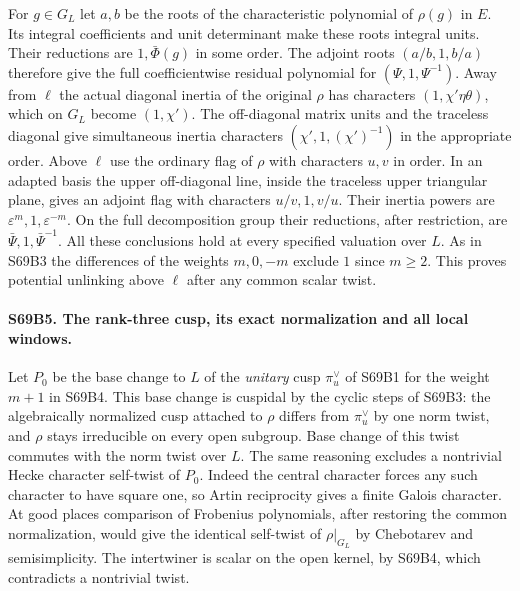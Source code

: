 For $g\in G_L$ let $a,b$ be the roots of the characteristic
polynomial of $\rho(g)$ in $E$. Its integral coefficients and
unit determinant make these roots integral units. Their reductions
are $1,\bar\Phi(g)$ in some order. The adjoint roots
$(a/b,1,b/a)$ therefore give the full coefficientwise residual
polynomial for $(\Psi,1,\Psi^{-1})$. Away from $\ell$ the actual
diagonal inertia of the original $\rho$ has characters
$(1,\chi'\eta\theta)$, which on $G_L$ become $(1,\chi')$.
The off-diagonal matrix units and the traceless diagonal give
simultaneous inertia characters $(\chi',1,(\chi')^{-1})$ in
the appropriate order. Above $\ell$ use the ordinary flag of
$\rho$ with characters $u,v$ in order. In an adapted basis the
upper off-diagonal line, inside the traceless upper triangular
plane, gives an adjoint flag with characters $u/v,1,v/u$.
Their inertia powers are $\varepsilon^m,1,\varepsilon^{-m}$.
On the full decomposition group their reductions, after restriction,
are $\bar\Psi,1,\bar\Psi^{-1}$. All these conclusions hold at
every specified valuation over $L$. As in S69B3 the differences
of the weights $m,0,-m$ exclude $1$ since $m\ge2$. This proves
potential unlinking above $\ell$ after any common scalar twist.

\paragraph{S69B5. The rank-three cusp, its exact normalization and all local windows.}
Let $P_0$ be the base change to $L$ of the \emph{unitary} cusp
$\pi_u^\vee$ of S69B1 for the weight $m+1$ in S69B4. This
base change is cuspidal by the cyclic steps of S69B3: the
algebraically normalized cusp attached to $\rho$ differs from
$\pi_u^\vee$ by one norm twist, and $\rho$ stays irreducible
on every open subgroup. Base change of this twist commutes with
the norm twist over $L$. The same reasoning excludes a
nontrivial Hecke character self-twist of $P_0$. Indeed the central
character forces any such character to have square one, so Artin
reciprocity gives a finite Galois character. At good places
comparison of Frobenius polynomials, after restoring the common
normalization, would give the identical self-twist of $\rho|_{G_L}$
by Chebotarev and semisimplicity. The intertwiner is scalar on
the open kernel, by S69B4, which contradicts a nontrivial twist.

